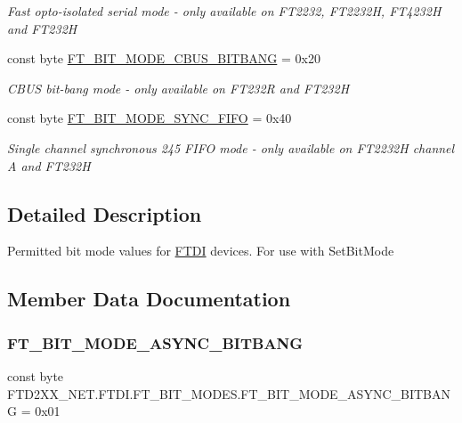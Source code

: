 \begin{DoxyCompactItemize}
\begin{DoxyCompactList}\small\item\em Fast opto-\/isolated serial mode -\/ only available on F\+T2232, F\+T2232H, F\+T4232H and F\+T232H \end{DoxyCompactList}\item 
const byte \mbox{\hyperlink{class_f_t_d2_x_x___n_e_t_1_1_f_t_d_i_1_1_f_t___b_i_t___m_o_d_e_s_aea26933ecabf2630f988fb12b3098882}{F\+T\+\_\+\+B\+I\+T\+\_\+\+M\+O\+D\+E\+\_\+\+C\+B\+U\+S\+\_\+\+B\+I\+T\+B\+A\+NG}} = 0x20
\begin{DoxyCompactList}\small\item\em C\+B\+US bit-\/bang mode -\/ only available on F\+T232R and F\+T232H \end{DoxyCompactList}\item 
const byte \mbox{\hyperlink{class_f_t_d2_x_x___n_e_t_1_1_f_t_d_i_1_1_f_t___b_i_t___m_o_d_e_s_a13e5f9775a32660f4f9bb39f5ded0b3c}{F\+T\+\_\+\+B\+I\+T\+\_\+\+M\+O\+D\+E\+\_\+\+S\+Y\+N\+C\+\_\+\+F\+I\+FO}} = 0x40
\begin{DoxyCompactList}\small\item\em Single channel synchronous 245 F\+I\+FO mode -\/ only available on F\+T2232H channel A and F\+T232H \end{DoxyCompactList}\end{DoxyCompactItemize}


\subsection{Detailed Description}
Permitted bit mode values for \mbox{\hyperlink{class_f_t_d2_x_x___n_e_t_1_1_f_t_d_i}{F\+T\+DI}} devices. For use with Set\+Bit\+Mode 



\subsection{Member Data Documentation}
\mbox{\label{class_f_t_d2_x_x___n_e_t_1_1_f_t_d_i_1_1_f_t___b_i_t___m_o_d_e_s_ad047a96bafb278a06532f82304ffb497}} 
\subsubsection{\texorpdfstring{FT\_BIT\_MODE\_ASYNC\_BITBANG}{FT\_BIT\_MODE\_ASYNC\_BITBANG}}
{\footnotesize\ttfamily const byte F\+T\+D2\+X\+X\+\_\+\+N\+E\+T.\+F\+T\+D\+I.\+F\+T\+\_\+\+B\+I\+T\+\_\+\+M\+O\+D\+E\+S.\+F\+T\+\_\+\+B\+I\+T\+\_\+\+M\+O\+D\+E\+\_\+\+A\+S\+Y\+N\+C\+\_\+\+B\+I\+T\+B\+A\+NG = 0x01}



